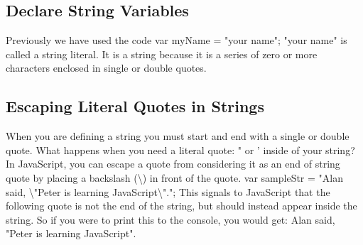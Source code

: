 \documentclass{article}%
\begin{document}
%
\subsection{Declare String Variables}%
\label{subsec:DeclareStringVariables}%
Previously we have used the code\newline%
var myName = "your name";\newline%
"your name" is called a string literal. It is a string because it is a series of zero or more characters enclosed in single or double quotes.\newline%

%
\subsection{Escaping Literal Quotes in Strings}%
\label{subsec:EscapingLiteralQuotesinStrings}%
When you are defining a string you must start and end with a single or double quote. What happens when you need a literal quote: " or ' inside of your string?\newline%
In JavaScript, you can escape a quote from considering it as an end of string quote by placing a backslash (\textbackslash{}) in front of the quote.\newline%
var sampleStr = "Alan said, \textbackslash{}"Peter is learning JavaScript\textbackslash{}".";\newline%
This signals to JavaScript that the following quote is not the end of the string, but should instead appear inside the string. So if you were to print this to the console, you would get:\newline%
Alan said, "Peter is learning JavaScript".\newline%

%
\end{document}
